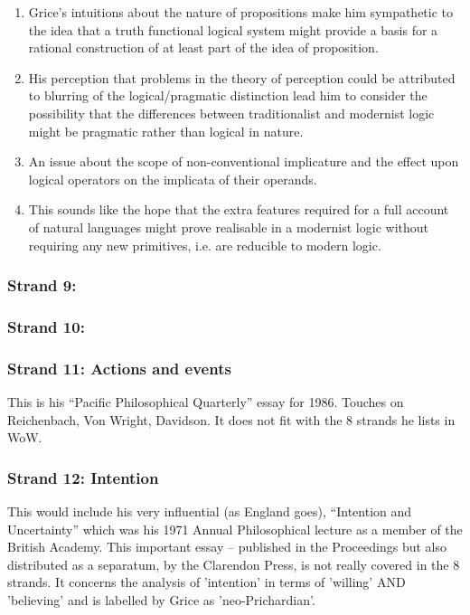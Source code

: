 \documentclass[10pt,titlepage]{book}
\begin{document}
\begin{enumerate}

\item Grice's intuitions about the nature of propositions make him sympathetic to the idea that a truth functional logical system might provide a basis for a rational construction of at least part of the idea of proposition.

\item His perception that problems in the theory of perception could be attributed to blurring of the logical/pragmatic distinction lead him to consider the possibility that the differences between traditionalist and modernist logic might be pragmatic rather than logical in nature.

\item An issue about the scope of non-conventional implicature and the effect upon logical operators on the implicata of their operands.

\item This sounds like the hope that the extra features required for a full account of natural languages might prove realisable in a modernist logic without requiring any new primitives, i.e. are reducible to modern logic.

\end{enumerate}

\subsubsection{Strand 9: }

\subsubsection{Strand 10: }

\subsubsection{Strand 11: Actions and events}

This is his ``Pacific Philosophical Quarterly'' essay for 1986.
Touches on Reichenbach, Von Wright, Davidson.
It does not fit with the 8 strands he lists in WoW.
 
\subsubsection{Strand 12: Intention}

This would include his very influential (as England goes), ``Intention and Uncertainty'' which was his 1971 Annual Philosophical  
lecture as a member of the British Academy.
This important essay -- published in the Proceedings but also distributed as a separatum, by the Clarendon Press, is  not really covered in the 8 strands.
It concerns the analysis of 'intention' in terms of 'willing' AND 'believing' and is labelled by Grice as 'neo-Prichardian'.
 
\end{document}
